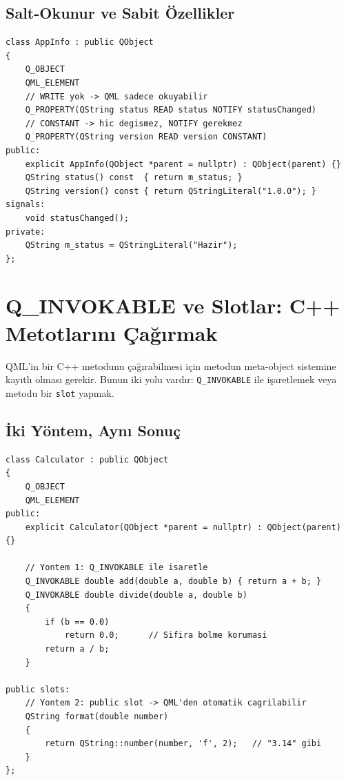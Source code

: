 \documentclass[11pt,a4paper]{article}
\newcommand{\kod}[1]{\texttt{\color{koyuGri}#1}}
\begin{document}
\subsection{Salt-Okunur ve Sabit Özellikler}

\begin{lstlisting}
class AppInfo : public QObject
{
    Q_OBJECT
    QML_ELEMENT
    // WRITE yok -> QML sadece okuyabilir
    Q_PROPERTY(QString status READ status NOTIFY statusChanged)
    // CONSTANT -> hic degismez, NOTIFY gerekmez
    Q_PROPERTY(QString version READ version CONSTANT)
public:
    explicit AppInfo(QObject *parent = nullptr) : QObject(parent) {}
    QString status() const  { return m_status; }
    QString version() const { return QStringLiteral("1.0.0"); }
signals:
    void statusChanged();
private:
    QString m_status = QStringLiteral("Hazir");
};
\end{lstlisting}

\section{Q\_INVOKABLE ve Slotlar: C++ Metotlarını Çağırmak}

QML'in bir C++ metodunu çağırabilmesi için metodun meta-object sistemine
kayıtlı olması gerekir. Bunun iki yolu vardır: \kod{Q\_INVOKABLE} ile
işaretlemek veya metodu bir \kod{slot} yapmak.

\subsection{İki Yöntem, Aynı Sonuç}

\begin{lstlisting}
class Calculator : public QObject
{
    Q_OBJECT
    QML_ELEMENT
public:
    explicit Calculator(QObject *parent = nullptr) : QObject(parent) {}

    // Yontem 1: Q_INVOKABLE ile isaretle
    Q_INVOKABLE double add(double a, double b) { return a + b; }
    Q_INVOKABLE double divide(double a, double b)
    {
        if (b == 0.0)
            return 0.0;      // Sifira bolme korumasi
        return a / b;
    }

public slots:
    // Yontem 2: public slot -> QML'den otomatik cagrilabilir
    QString format(double number)
    {
        return QString::number(number, 'f', 2);   // "3.14" gibi
    }
};
\end{lstlisting}
\end{document}
